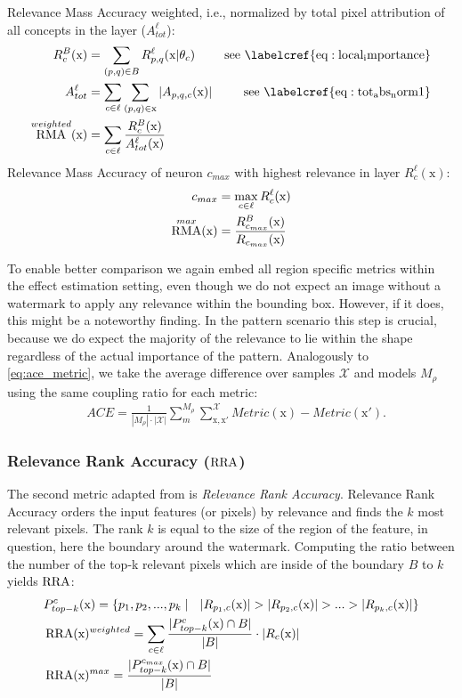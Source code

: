 Relevance Mass Accuracy weighted, i.e., normalized by total pixel attribution of all concepts in the layer ($A_{tot}^{\ell}$):
\begin{align}\displaystyle
R_{c}^{B}(\mathrm{x}) &= \sum_{(p,q) \in B} R_{p,q}^{\ell}(\mathrm{x} | \theta_c) & \mathrm{ see \ \labelcref{eq:local_importance}} \\
A_{tot}^{\ell} &=\sum_{c \in \ell} \sum_{(p,q) \in \mathrm{x}} |A_{p,q,c}(\mathrm{x})| & \mathrm{ see \ \labelcref{eq:tot_abs_norm1}} \\
\RMA^{weighted}(\mathrm{x}) &= \sum_{c \in \ell}  \frac{R_{c}^{B}(\mathrm{x})}{A_{tot}^{\ell}(\mathrm{x})} 
\end{align}
Relevance Mass Accuracy of neuron $c_{max}$ with highest relevance in layer $R_c^{\ell}(\mathrm{x})$:
\begin{align}\displaystyle
c_{max} &= \max_{c \in \ell} R_c^{\ell}(\mathrm{x}) \\
\operatorname*{RMA}^{max}(\mathrm{x}) &= \frac{
R_{c_{max}}^B(\mathrm{x})}{R_{c_{max}}(\mathrm{x})} 
\end{align}

To enable better comparison we again embed all region specific metrics within the effect estimation setting, even though we do not expect an image without a watermark to apply any relevance within the bounding box. However, if it does, this might be a noteworthy finding. In the pattern scenario this step is crucial, because we do expect the majority of the relevance to lie within the shape regardless of the actual importance of the pattern.
Analogously to \cref{eq:ace_metric}, we take the average difference over samples $\mathcal{X}$ and models $M_{\rho}$  using the same coupling ratio for each metric:
\begin{align}\label{eq:ace_rma}
& ACE = \frac{1}{|M_\rho|\cdot |\mathcal{X}| }\sum_{m}^{M_{\rho}} \sum_{\mathrm{x,x'}}^{\mathcal{X}} Metric(\mathrm{x}) - Metric(\mathrm{x'}).
\end{align}

\subsubsection{Relevance Rank Accuracy ($\operatorname*{RRA}$)}
The second metric adapted from \citet{Arras2022} is \textit{Relevance Rank Accuracy}.  
Relevance Rank Accuracy orders the input features (or pixels) by relevance and finds the $k$ most relevant pixels. The rank $k$ is equal to the size of the region of the feature, in question, here the boundary around the watermark. Computing the ratio between the number of the top-k relevant pixels which are inside of the boundary $B$ to $k$ yields $\operatorname*{RRA}$:
\begin{align}
& P_{top-k}^{c}(\mathrm{x}) = \left\{p_1, p_2,...,p_k \mid \ \  |R_{p_1,c}(\mathrm{x})| > |R_{p_2,c}(\mathrm{x})| > ... > |R_{p_k,c}(\mathrm{x})| \right\} \notag \\
& \RRA(\mathrm{x})^{weighted} = \sum_{c \in \ell} \frac{|P_{top-k}^{c}(\mathrm{x}) \cap B|}{|B|} \cdot |R_c(\mathrm{x})| \\
& \RRA(\mathrm{x})^{max} = \frac{|P_{top-k}^{c_{max}}(\mathrm{x}) \cap B|}{|B|}
\end{align}

